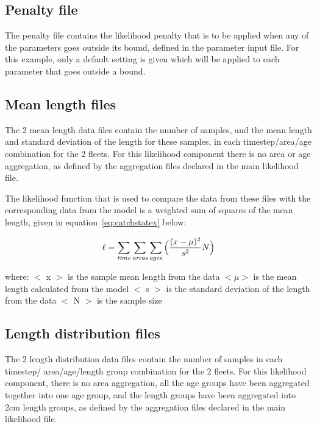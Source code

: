 \documentclass[10pt,titlepage]{article}
\begin{document}
{\small }

\subsection{Penalty file}
The penalty file contains the likelihood penalty that is to be applied when any of the parameters goes outside its bound, defined in the parameter input file.  For this example, only a default setting is given which will be applied to each parameter that goes outside a bound.

{\small }

\subsection{Mean length files}
The 2 mean length data files contain the number of samples, and the mean length and standard deviation of the length for these samples, in each timestep/area/age combination for the 2 fleets.  For this likelihood component there is no area or age aggregation, as defined by the aggregation files declared in the main likelihood file.

\bigskip
The likelihood function that is used to compare the data from these files with the corresponding data from the model is a weighted sum of squares of the mean length, given in equation~\ref{eq:catchstatex} below:

\begin{equation}\label{eq:catchstatex}
\ell = \sum_{\it time}\sum_{\it areas}\sum_{\it ages} \Big(\frac{(x-\mu)^2} {s^2} N\Big)
\end{equation}

where:\newline
$<$ x $>$ is the sample mean length from the data\newline
$<\mu>$ is the mean length calculated from the model\newline
$<$ s $>$ is the standard deviation of the length from the data\newline
$<$ N $>$ is the sample size

{\small }
{\small }

\subsection{Length distribution files}
The 2 length distribution data files contain the number of samples in each timestep/ area/age/length group combination for the 2 fleets.  For this likelihood component, there is no area aggregation, all the age groups have been aggregated together into one age group, and the length groups have been aggregated into 2cm length groups, as defined by the aggregation files declared in the main likelihood file.
\end{document}
